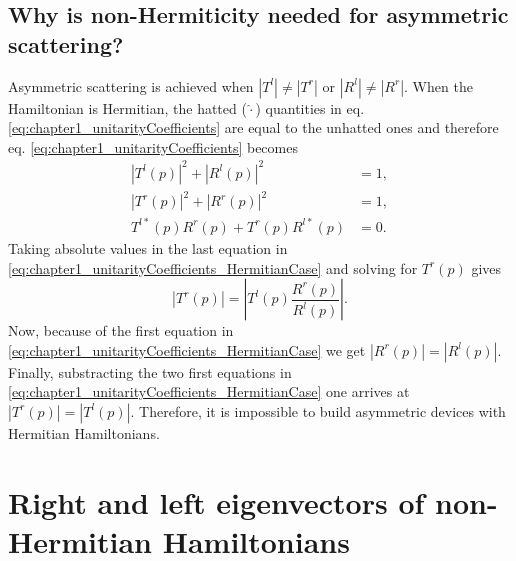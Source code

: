 \subsection{Why is non-Hermiticity needed for asymmetric scattering?}

Asymmetric scattering is achieved when $\left|T^l\right|\neq\left|T^r\right|$ or $\left|R^l\right|\neq\left|R^r\right|$. When the Hamiltonian is Hermitian, the hatted ($\widehat{\cdot}$) quantities in eq. \eqref{eq:chapter1_unitarityCoefficients} are equal to the unhatted ones and therefore eq. \eqref{eq:chapter1_unitarityCoefficients} becomes
%
\begin{align}
  \left|T^l(p)\right|^2 +  \left|R^l(p)\right|^2  &= 1,\nonumber
  \\
  \left|T^r(p)\right|^2 +  \left|R^r(p)\right|^2  &= 1,\nonumber
  \\
   T^{l*}(p) R^r(p) + T^r(p)  R^{l*}(p) &= 0.
  \label{eq:chapter1_unitarityCoefficients_HermitianCase}
\end{align}
%
Taking absolute values in the last equation in \eqref{eq:chapter1_unitarityCoefficients_HermitianCase} and solving for $T^{r}(p)$ gives
%
\begin{equation}
  \left|T^r(p)\right|  = \left| T^{l}(p) \frac{R^r(p)}{R^{l}(p)} \right|.
\end{equation}
%
Now, because of the first equation in \eqref{eq:chapter1_unitarityCoefficients_HermitianCase} we get $\left|R^r(p)\right| = \left|R^l(p)\right|$. Finally, substracting the two first equations in \eqref{eq:chapter1_unitarityCoefficients_HermitianCase} one arrives at $\left|T^r(p)\right| = \left|T^l(p)\right|$. Therefore, it is impossible to build asymmetric devices with Hermitian Hamiltonians.

\section{Right and left eigenvectors of non-Hermitian Hamiltonians\label{sec:chapter1_LeftAndRightEigenstates}}

